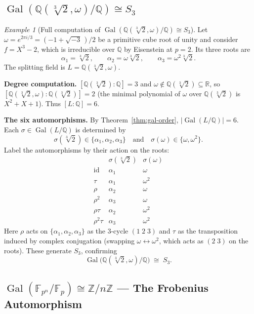 \documentclass[12pt,a4paper,openany]{book}
\theoremstyle{definition}
\theoremstyle{remark}
\newtheorem{example}{Example}[chapter]
\newcommand{\Z}{\mathbb{Z}}
\newcommand{\Q}{\mathbb{Q}}
\newcommand{\R}{\mathbb{R}}
\newcommand{\F}{\mathbb{F}}
\DeclareMathOperator{\Gal}{Gal}
\begin{document}
\subsection{$\Gal(\Q(\sqrt[3]{2},\omega)/\Q)\cong S_{3}$}
\label{subsec:ex-s3}

\begin{example}[{Full computation of $\Gal(\Q(\sqrt[3]{2},\omega)/\Q)\cong S_{3}$}]
\label{ex:gal-s3}
\index{Galois group!of $\Q(\sqrt[3]{2},\omega)/\Q$}
Let $\omega=e^{2\pi i/3}=(-1+\sqrt{-3}\,)/2$ be a primitive cube root of
unity and consider $f=X^{3}-2$, which is irreducible over $\Q$ by
Eisenstein at $p=2$.  Its three roots are
\[
  \alpha_{1}=\sqrt[3]{2},\qquad
  \alpha_{2}=\omega\sqrt[3]{2},\qquad
  \alpha_{3}=\omega^{2}\sqrt[3]{2}.
\]
The splitting field is $L=\Q(\sqrt[3]{2},\omega)$.

\medskip\noindent
\textbf{Degree computation.}\;
$[\Q(\sqrt[3]{2}):\Q]=3$ and $\omega\notin\Q(\sqrt[3]{2})\subseteq\R$, so
$[\Q(\sqrt[3]{2},\omega):\Q(\sqrt[3]{2})]=2$ (the minimal polynomial of
$\omega$ over $\Q(\sqrt[3]{2})$ is $X^{2}+X+1$).  Thus $[L:\Q]=6$.

\medskip\noindent
\textbf{The six automorphisms.}\;
By Theorem~\ref{thm:gal-order}, $|\Gal(L/\Q)|=6$.  Each $\sigma\in
\Gal(L/\Q)$ is determined by
\[
  \sigma(\sqrt[3]{2})\in\{\alpha_{1},\alpha_{2},\alpha_{3}\}
  \quad\text{and}\quad
  \sigma(\omega)\in\{\omega,\omega^{2}\}.
\]
Label the automorphisms by their action on the roots:
\[
\renewcommand{\arraystretch}{1.2}
\begin{array}{c|cc}
  & \sigma(\sqrt[3]{2}) & \sigma(\omega) \\\hline
  \mathrm{id} & \alpha_{1} & \omega \\
  \tau & \alpha_{1} & \omega^{2} \\
  \rho & \alpha_{2} & \omega \\
  \rho^{2} & \alpha_{3} & \omega \\
  \rho\tau & \alpha_{2} & \omega^{2} \\
  \rho^{2}\tau & \alpha_{3} & \omega^{2}
\end{array}
\]
Here $\rho$ acts on $\{\alpha_{1},\alpha_{2},\alpha_{3}\}$ as the $3$-cycle
$(1\;2\;3)$ and $\tau$ as the transposition induced by complex conjugation
(swapping $\omega\leftrightarrow\omega^{2}$, which acts as $(2\;3)$ on the
roots).  These generate $S_{3}$, confirming
\[
  \Gal\!\bigl(\Q(\sqrt[3]{2},\omega)/\Q\bigr)\;\cong\; S_{3}.
\]
\end{example}

\subsection{$\Gal(\F_{p^{n}}/\F_{p})\cong\Z/n\Z$ — The Frobenius Automorphism}
\label{subsec:ex-frobenius}
\end{document}
